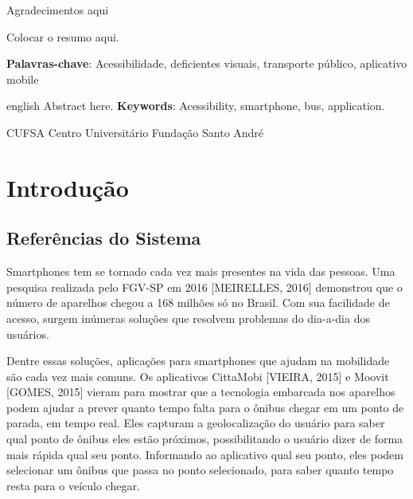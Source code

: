 \documentclass[
	12pt,				%
	oneside,			%
	a4paper,			%
	brazil				%
]{abntex2}
\newcommand*{\BeginNoToc}{%
  \addtocontents{toc}{%
    \edef\protect\SavedTocDepth{\protect\the\protect\value{tocdepth}}%
  }%
  \addtocontents{toc}{%
    \protect\setcounter{tocdepth}{-10}%
  }%
}
\newcommand*{\EndNoToc}{%
  \addtocontents{toc}{%
    \protect\setcounter{tocdepth}{\protect\SavedTocDepth}%
  }%
}
\begin{document}
\begin{agradecimentos} 
Agradecimentos aqui
\end{agradecimentos} 


\setlength{\absparsep}{18pt} %
\begin{resumo}
 
Colocar o resumo aqui.

 \textbf{Palavras-chave}: Acessibilidade, deficientes visuais, transporte público, aplicativo mobile
\end{resumo}

\begin{resumo}[Abstract] 
\begin{otherlanguage*}{english}
Abstract here.
\vspace{\onelineskip} 
\noindent \textbf{Keywords}: Acessibility, smartphone, bus, application. 
\end{otherlanguage*} 
\end{resumo} 

\BeginNoToc
\tableofcontents*
\newpage
\listoffigures
\EndNoToc

\begin{siglas} 
\item[CUFSA] Centro Universitário Fundação Santo André
\end{siglas}
\EndNoToc

\textual

\chapter{Introdução}

\section{Referências do Sistema}

	Smartphones tem se tornado cada vez mais presentes na vida das pessoas. Uma pesquisa realizada pelo FGV-SP em 2016 [MEIRELLES, 2016] demonstrou que o número de aparelhos chegou a 168 milhões só no Brasil. Com sua facilidade de acesso, surgem inúmeras soluções que resolvem problemas do dia-a-dia dos usuários.

	Dentre essas soluções, aplicações para smartphones que ajudam na mobilidade são cada vez mais comuns. Os aplicativos CittaMobi [VIEIRA, 2015] e Moovit [GOMES, 2015] vieram para mostrar que a tecnologia embarcada nos aparelhos podem ajudar a prever quanto tempo falta para o ônibus chegar em um ponto de parada, em tempo real. Eles capturam a geolocalização do usuário para saber qual ponto de ônibus eles estão próximos, possibilitando o usuário dizer de forma mais rápida qual seu ponto. Informando ao aplicativo qual seu ponto, eles podem selecionar um ônibus que passa no ponto selecionado, para saber quanto tempo resta para o veículo chegar.
\end{document}
